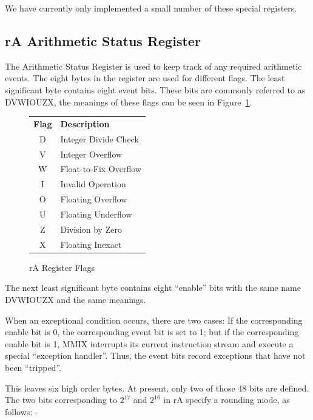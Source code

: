 \documentclass[a4paper,11pt]{report}
\newcommand{\head}[1]{\textbf{#1}}
\begin{document}
We have currently only implemented a small number of these special registers.
\clearpage
\subsection[Arithmetic Status Register]{rA Arithmetic Status Register}\label{rA}
The Arithmetic Status Register is used to keep track of any required arithmetic events. The eight bytes in the register are used for different flags. The least significant byte contains eight event bits. These bits are commonly referred to as DVWIOUZX, the meanings of these flags can be seen in Figure~\ref{fig:ra_reg_flags}.

\begin{figure}[!ht]
\begin{center}
\begin{tabular}{ c l }
\head{Flag} & \head{Description}\\
D & Integer Divide Check\\
V & Integer Overflow\\
W & Float-to-Fix Overflow\\
I & Invalid Operation\\
O & Floating Overflow\\
U & Floating Underflow\\
Z & Division by Zero\\
X & Floating Inexact\\
\end{tabular}
\end{center}
\caption{rA Register Flags}
\label{fig:ra_reg_flags}
\end{figure}

The next least significant byte contains eight ``enable'' bits with the same name DVWIOUZX and the same meanings.  

When an exceptional condition occurs, there are two cases: If the corresponding enable bit is 0, the corresponding event bit is set to 1; but if the corresponding enable bit is 1, MMIX interrupts its current instruction stream and execute a special ``exception handler''.  Thus, the event bits record exceptions that have not been ``tripped''.

This leaves six high order bytes.  At present, only  two of those 48 bits are defined. The two bits corresponding to 
\begin{math}
2^{17}
\end{math}
and 
\begin{math}
2^{16}
\end{math}
in rA specify a rounding mode, as follows: -
\end{document}
